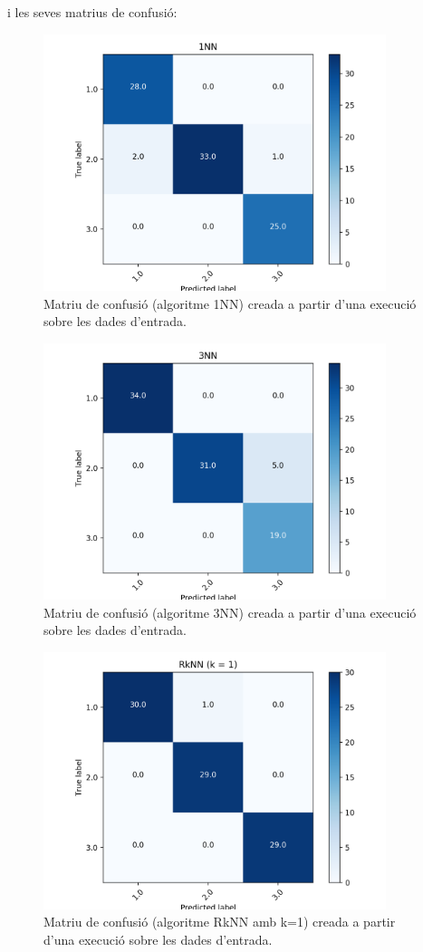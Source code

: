 \documentclass{article} %
\begin{document}
{	i les seves matrius de confusió:
	\begin{figure}[H]
		\includegraphics[width=10cm]{1nn}
		\centering
		\color{blue}
		\caption{Matriu de confusió (algoritme 1NN) creada a partir d'una execució sobre les dades d'entrada.}\label{visina8}
	\end{figure}

	\begin{figure}[H]
		\includegraphics[width=10cm]{3nn}
		\centering
		\color{blue}
		\caption{Matriu de confusió (algoritme 3NN) creada a partir d'una execució sobre les dades d'entrada.}\label{visina8}
	\end{figure}

	\begin{figure}[H]
		\includegraphics[width=10cm]{r1nn}
		\centering
		\color{blue}
		\caption{Matriu de confusió (algoritme RkNN amb k=1) creada a partir d'una execució sobre les dades d'entrada.}\label{visina8}
	\end{figure}

}
\end{document}
